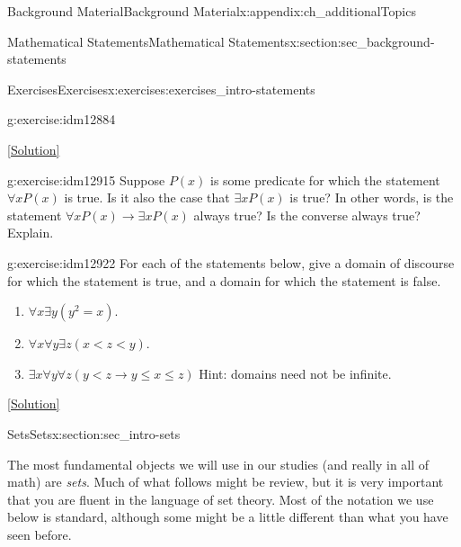 \documentclass[oneside,10pt,]{book}
\numberwithin{equation}{chapter}
\def\imp{\rightarrow}
\newcommand{\lt}{<}
\begin{document}
\begin{appendixptx}{Background Material}{}{Background Material}{}{}{x:appendix:ch_additionalTopics}
\begin{sectionptx}{Mathematical Statements}{}{Mathematical Statements}{}{}{x:section:sec_background-statements}
\begin{exercises-subsection}{Exercises}{}{Exercises}{}{}{x:exercises:exercises_intro-statements}
\begin{divisionexercise}{8}{}{}{g:exercise:idm12884}
\begin{enumerate}[label=(\alph*)]
\end{enumerate}
%
\space\hspace*{0pt}\hfill{\tiny\hyperlink{g:solution:idm12896-main}{[Solution]}}\end{divisionexercise}%
\begin{divisionexercise}{9}{}{}{g:exercise:idm12915}%
Suppose \(P(x)\) is some predicate for which the statement \(\forall x P(x)\) is true. Is it also the case that \(\exists x P(x)\) is true? In other words, is the statement \(\forall x P(x) \imp \exists x P(x)\) always true? Is the converse always true? Explain.%
\end{divisionexercise}%
\begin{divisionexercise}{10}{}{}{g:exercise:idm12922}%
For each of the statements below, give a domain of discourse for which the statement is true, and a domain for which the statement is false.%
\par
%
\begin{enumerate}[label=(\alph*)]
\item{}\(\forall x \exists y (y^2 = x)\).%
\item{}\(\forall x \forall y \exists z (x \lt  z \lt  y)\).%
\item{}\(\exists x \forall y \forall z (y \lt  z \imp y \le x \le z)\) Hint: domains need not be infinite.%
\end{enumerate}
%
\space\hspace*{0pt}\hfill{\tiny\hyperlink{g:solution:idm12933-main}{[Solution]}}\end{divisionexercise}%
\end{exercises-subsection}
\end{sectionptx}
%
%
\typeout{************************************************}
\typeout{************************************************}
%
\begin{sectionptx}{Sets}{}{Sets}{}{}{x:section:sec_intro-sets}
\begin{introduction}{}%
The most fundamental objects we will use in our studies (and really in all of math) are \emph{sets}. Much of what follows might be review, but it is very important that you are fluent in the language of set theory. Most of the notation we use below is standard, although some might be a little different than what you have seen before.%
\par

\end{introduction}
\end{sectionptx}
\end{appendixptx}
\end{document}
